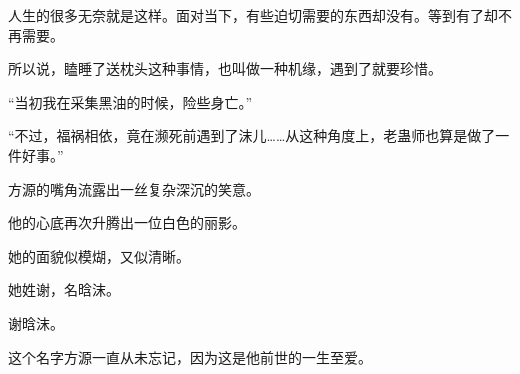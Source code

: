 \begin{this_body}
人生的很多无奈就是这样。面对当下，有些迫切需要的东西却没有。等到有了却不再需要。

所以说，瞌睡了送枕头这种事情，也叫做一种机缘，遇到了就要珍惜。

“当初我在采集黑油的时候，险些身亡。”

“不过，福祸相依，竟在濒死前遇到了沫儿……从这种角度上，老蛊师也算是做了一件好事。”

方源的嘴角流露出一丝复杂深沉的笑意。

他的心底再次升腾出一位白色的丽影。

她的面貌似模煳，又似清晰。

她姓谢，名晗沫。

谢晗沫。

这个名字方源一直从未忘记，因为这是他前世的一生至爱。

\end{this_body}

